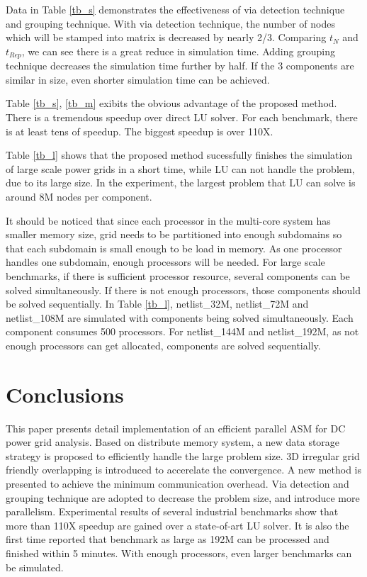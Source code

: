\documentclass{sig-alternate}
\begin{document}
	Data in Table \ref{tb_s} demonstrates the effectiveness of via detection technique and grouping technique. With via detection 
	technique, the 
	number of nodes which will be stamped into matrix is decreased by nearly 2/3. Comparing $t_N$ and $t_{Rep}$, we can see there is a
	great reduce in simulation time. Adding grouping technique decreases the simulation time further by half. If the 3 components are 
	similar in size, even shorter simulation time can be achieved.

	Table \ref{tb_s}, \ref{tb_m} exibits the obvious advantage of the proposed method. There is a tremendous 
	speedup over direct LU solver. For each benchmark, there is at least tens of speedup. The biggest speedup is over 110X. 

	Table \ref{tb_l} shows that the proposed method sucessfully finishes the simulation of large scale power grids
	in a short time, while LU can not handle the problem, due to its large size. In the experiment, the largest problem that LU can solve is 
	around 8M nodes per component. 

	It should be noticed that since each processor in the multi-core system has smaller memory size, grid needs to be 
	partitioned into enough subdomains so that each subdomain is small enough to be load in memory. As one processor handles one 
	subdomain, enough processors will be needed. For large scale benchmarks, if there is sufficient processor resource, several 
	components can be solved simultaneously. If there is not enough processors, those components should be 
	solved sequentially. In Table \ref{tb_l}, netlist\_32M, netlist\_72M and netlist\_108M are 
	simulated with components being solved simultaneously. Each component consumes 500 processors. For netlist\_144M and 
	netlist\_192M, as not enough processors can get allocated, components are solved sequentially.

\section{Conclusions}
	This paper presents detail implementation of an efficient parallel ASM for DC power grid analysis. Based on distribute memory 
	system, a new data storage strategy is proposed to efficiently handle the large problem size. 3D irregular grid 
	friendly overlapping 
	is introduced to accerelate the convergence. A new method is presented to achieve the minimum communication overhead. Via 
	detection and grouping technique are adopted to decrease the problem size, and introduce more parallelism. Experimental 
	results of several industrial benchmarks show that more than 110X speedup are gained over a state-of-art LU solver. It is also 
	the first time reported that benchmark as large as 192M can be processed and finished within 5 minutes. With enough processors, 
	even larger benchmarks can be simulated.




\end{document}
